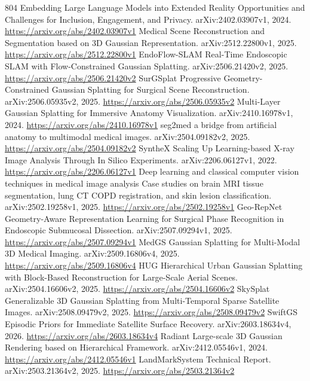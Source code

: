 \documentclass[11pt]{article}
\begin{document}
\begin{thebibliography}{804}
 Embedding Large Language Models into Extended Reality Opportunities and Challenges for Inclusion, Engagement, and Privacy. arXiv:2402.03907v1, 2024. \url{https://arxiv.org/abs/2402.03907v1}
 Medical Scene Reconstruction and Segmentation based on 3D Gaussian Representation. arXiv:2512.22800v1, 2025. \url{https://arxiv.org/abs/2512.22800v1}
 EndoFlow-SLAM Real-Time Endoscopic SLAM with Flow-Constrained Gaussian Splatting. arXiv:2506.21420v2, 2025. \url{https://arxiv.org/abs/2506.21420v2}
 SurGSplat Progressive Geometry-Constrained Gaussian Splatting for Surgical Scene Reconstruction. arXiv:2506.05935v2, 2025. \url{https://arxiv.org/abs/2506.05935v2}
 Multi-Layer Gaussian Splatting for Immersive Anatomy Visualization. arXiv:2410.16978v1, 2024. \url{https://arxiv.org/abs/2410.16978v1}
 seg2med a bridge from artificial anatomy to multimodal medical images. arXiv:2504.09182v2, 2025. \url{https://arxiv.org/abs/2504.09182v2}
 SyntheX Scaling Up Learning-based X-ray Image Analysis Through In Silico Experiments. arXiv:2206.06127v1, 2022. \url{https://arxiv.org/abs/2206.06127v1}
 Deep learning and classical computer vision techniques in medical image analysis Case studies on brain MRI tissue segmentation, lung CT COPD registration, and skin lesion classification. arXiv:2502.19258v1, 2025. \url{https://arxiv.org/abs/2502.19258v1}
 Geo-RepNet Geometry-Aware Representation Learning for Surgical Phase Recognition in Endoscopic Submucosal Dissection. arXiv:2507.09294v1, 2025. \url{https://arxiv.org/abs/2507.09294v1}
 MedGS Gaussian Splatting for Multi-Modal 3D Medical Imaging. arXiv:2509.16806v4, 2025. \url{https://arxiv.org/abs/2509.16806v4}
 HUG Hierarchical Urban Gaussian Splatting with Block-Based Reconstruction for Large-Scale Aerial Scenes. arXiv:2504.16606v2, 2025. \url{https://arxiv.org/abs/2504.16606v2}
 SkySplat Generalizable 3D Gaussian Splatting from Multi-Temporal Sparse Satellite Images. arXiv:2508.09479v2, 2025. \url{https://arxiv.org/abs/2508.09479v2}
 SwiftGS Episodic Priors for Immediate Satellite Surface Recovery. arXiv:2603.18634v4, 2026. \url{https://arxiv.org/abs/2603.18634v4}
 Radiant Large-scale 3D Gaussian Rendering based on Hierarchical Framework. arXiv:2412.05546v1, 2024. \url{https://arxiv.org/abs/2412.05546v1}
 LandMarkSystem Technical Report. arXiv:2503.21364v2, 2025. \url{https://arxiv.org/abs/2503.21364v2}

\end{thebibliography}
\end{document}
